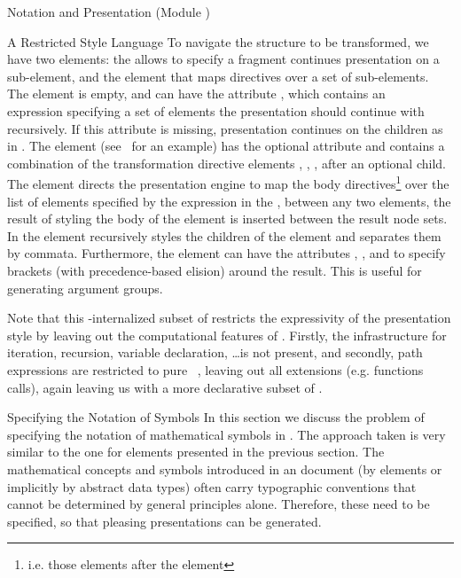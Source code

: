 \begin{tchapter}[id=pres,short=Notation and Presentation]{Notation and Presentation (Module {})}
\begin{tsection}[id=style]{A Restricted Style Language}
To navigate the {\omdoc} structure to be transformed, we have two elements: the
{} allows to specify a fragment continues presentation on a sub-element,
and the {} element that maps directives over a set of sub-elements.  The
{} element is empty, and can have the attribute
{}, which contains an {\xpath}~\cite{ClaDeR:xpath99} expression
specifying a set of {\omdoc} elements the presentation should continue with recursively.
If this attribute is missing, presentation continues on the children as in
{}. The {} element (see~ for an
example) has the optional attribute {} and contains a combination
of the transformation directive elements {}, {},
{}, {} after an optional {} child. The
{} element directs the presentation engine to map the body
directives\footnote{i.e. those elements after the {} element} over the
list of elements specified by the {\xpath} expression in the {},
between any two elements, the result of styling the body of the {}
element is inserted between the result node sets. In {} the
{} element recursively styles the children of the
{} element and separates them by commata.  Furthermore, the
{} element can have the attributes {},
{}, and {} to specify brackets (with
precedence-based elision) around the result. This is useful for generating argument
groups.

  Note that this {\omdoc}-internalized subset of {\xslt} restricts the expressivity of the
  presentation style by leaving out the computational features of {\xslt}.  Firstly, the
  infrastructure for iteration, recursion, variable declaration, \ldots is not present,
  and secondly, path expressions are restricted to pure {\xpath}~\cite{ClaDeR:xpath99},
  leaving out all {\xslt} extensions (e.g. functions calls), again leaving us with a more
  declarative subset of {\xslt}.
\end{tsection}

\begin{tsection}[id=presentation,short=Notation of Symbols]{Specifying the Notation of Symbols}
  In this section we discuss the problem of specifying the notation of mathematical
  symbols in {\omdoc}. The approach taken is very similar to the one for {\omdoc} elements
  presented in the previous section. The mathematical concepts and symbols introduced in
  an {\omdoc} document (by {} elements or implicitly by abstract data
  types) often carry typographic conventions that cannot be determined by general
  principles alone. Therefore, these need to be specified, so that pleasing presentations
  can be generated.
  

\end{tsection}
\end{tchapter}
